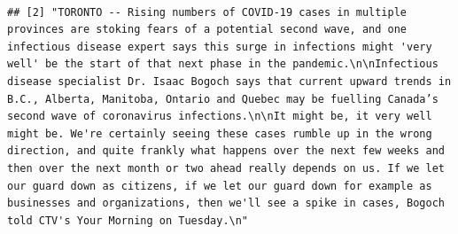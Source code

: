 \documentclass[]{article}
\begin{document}
\begin{verbatim}
                                                                                                                                                                                                                                                                                                                                                                                                                                                 
## [2] "TORONTO -- Rising numbers of COVID-19 cases in multiple provinces are stoking fears of a potential second wave, and one infectious disease expert says this surge in infections might 'very well' be the start of that next phase in the pandemic.\n\nInfectious disease specialist Dr. Isaac Bogoch says that current upward trends in B.C., Alberta, Manitoba, Ontario and Quebec may be fuelling Canada’s second wave of coronavirus infections.\n\nIt might be, it very well might be. We're certainly seeing these cases rumble up in the wrong direction, and quite frankly what happens over the next few weeks and then over the next month or two ahead really depends on us. If we let our guard down as citizens, if we let our guard down for example as businesses and organizations, then we'll see a spike in cases, Bogoch told CTV's Your Morning on Tuesday.\n"                                                                                                                                                                                                                                                                                                                                                                                                                                                                                                                                                                                                                                                                                                                                                                                                                                                                                                                                                                                                                                                                                                                                                                                                                                                                                                                                                                                                                                                                                                                                                                                                                                                                                                                                                                                                                                                                                                                                                                                                                                                                                                            
\end{verbatim}
\end{document}
